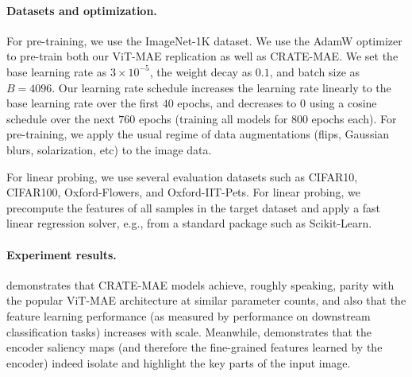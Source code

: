 \documentclass[../../book-main.tex]{subfiles}
\begin{document}
\paragraph{Datasets and optimization.} For pre-training, we use the ImageNet-1K dataset. We use the AdamW optimizer to pre-train both our ViT-MAE replication as well as CRATE-MAE. We set the base learning rate as \(3 \times 10^{-5}\), the weight decay as \(0.1\), and batch size as \(B = 4096\). Our learning rate schedule increases the learning rate linearly to the base learning rate over the first \(40\) epochs, and decreases to \(0\) using a cosine schedule over the next \(760\) epochs (training all models for \(800\) epochs each). For pre-training, we apply the usual regime of data augmentations (flips, Gaussian blurs, solarization, etc) to the image data.

For linear probing, we use several evaluation datasets such as CIFAR10, CIFAR100, Oxford-Flowers, and Oxford-IIT-Pets. For linear probing, we precompute the features of all samples in the target dataset and apply a fast linear regression solver, e.g., from a standard package such as Scikit-Learn.

\paragraph{Experiment results.}  demonstrates that CRATE-MAE models achieve, roughly speaking, parity with the popular ViT-MAE architecture at similar parameter counts, and also that the feature learning performance (as measured by performance on downstream classification tasks) increases with scale. Meanwhile,  demonstrates that the encoder saliency maps (and therefore the fine-grained features learned by the encoder) indeed isolate and highlight the key parts of the input image.
\end{document}
